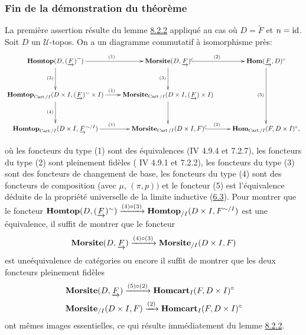 \documentclass[10pt]{../fichiers-configuration-latex/smfart}
\begin{document}
\subsubsection{Fin de la démonstration du
  théorème}
La première
assertion résulte du lemme \hyperref[VI.lem8.2.2]{8.2.2} appliqué au cas
où $D =
\underrightarrow{F}$ et $n = \operatorname{id}$. Soit $D$ un $𝒰$-topos. On a un
diagramme commutatif à isomorphisme près:
{\def\objectstyle{\scriptstyle}
\def\labelstyle{\scriptstyle}
\[
\xymatrix@C=.8cm@R=1.15cm{
\Hhomtop(D,{(\underrightarrow{F})}^{\sim}) \ar[r]^{(1)}\ar[d]_{(3)}&
\Mmorsite(D,\underrightarrow{F}) \ar@{^{(}->}[r]^{(2)} \ar[d]_{(3)}&
\Hhom(\underrightarrow{F},D)^{\circ}\ar[dd]_{(5)}\\
\Hhomtop_{\Cart/I}(D\times I,(\underrightarrow{F})^{\sim}\times
I)  \ar[r]^{(1)} \ar[d]_{(4)}& \Mmorsite_{\Cart/I}(D\times I,
(\underrightarrow{F})\times I) \ar[d]&\\
\Hhomtop_{\Cart/I}(D\times I,\underrightarrow{F}^{\sim/I})
\ar[r]^{(1)} & \Mmorsite_{\Cart/I}(D\times I, F)  \ar@{^{(}->}[r]^{(2)} &
\Hhom_{\Cart/I}(F,D\times I)^{\circ},
}
\]}

\noindent où les foncteurs du type (1) sont des équivalences
({IV 4.9.4  et 7.2.7), les foncteurs du type (2) sont
pleinement fidèles ( IV 4.9.1} et 7.2.2), les foncteurs
du type (3) sont des foncteurs de
changement de base, les foncteurs du type (4) sont des foncteurs de
composition (avec $\mu$, \resp $(\pi, p))$ et le foncteur (5) est
l'équivalence déduite de la propriété universelle de la limite
inductive (\hyperref[VI.def6.3]{6.3}). Pour montrer que le foncteur
$\operatorname{\mathbf{Homtop}}(D, (\underrightarrow{F})^{\sim}) \xrightarrow{(4) \circ
(3)} \operatorname{\mathbf{Homtop}}_{/I} (D \times I, F^{\sim/I})$ est une équivalence, il
suffit de montrer que le foncteur
$$
\operatorname{\mathbf{Morsite}}(D, \underrightarrow{F})
\xrightarrow{(4) \circ (3)} \operatorname{\mathbf{Morsite}}_{/I}(D \times I,F)
$$
est une\pageoriginale équivalence de catégories ou encore il suffit
de montrer que les deux foncteurs pleinement fidèles
\begin{align*}
& \operatorname{\mathbf{Morsite}}(D, \underrightarrow{F}) \xrightarrow{(5) \circ (2)} \operatorname{\mathbf{Homcart}}_I(F, D \times I)^{\circ}\\
& \operatorname{\mathbf{Morsite}}_{/I}(D \times I, F) \xrightarrow{(2)} \operatorname{\mathbf{Homcart}}_I(F, D \times
I)^{\circ}
\end{align*}
ont mêmes images essentielles, ce qui résulte immédiatement du lemme
\hyperref[VI.lem8.2.2]{8.2.2}.

\subsubsection{}
\end{document}
